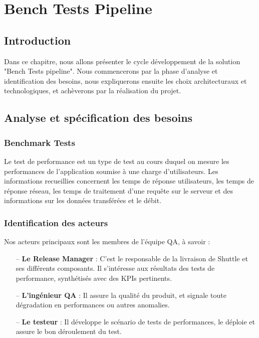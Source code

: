 
\setcounter{chapter}{2}
\chapter{Bench Tests Pipeline}
\minitoc %
\graphicspath{{Chapitre3/figures/}}

\pagestyle{fancy}
\fancyhf{}
\fancyhead[R]{\bfseries\rightmark}
\fancyfoot[R]{\thepage}
\renewcommand{\headrulewidth}{0.5pt}
\renewcommand{\footrulewidth}{0pt}
\renewcommand{\chaptermark}[1]{\markboth{\MakeUppercase{\chaptername~\thechapter. #1 }}{}}
\renewcommand{\sectionmark}[1]{\markright{\thechapter.\thesection~ #1}}

\begin{spacing}{1.2}

\section*{Introduction}
Dans ce chapitre, nous allons présenter le cycle développement de la solution "Bench Tests pipeline". Nous commencerons par la phase d’analyse et identification des besoins, nous expliquerons ensuite les choix architecturaux et technologiques, et achèverons par la réalisation du projet.  
\section{Analyse et spécification des besoins}
\subsection{Benchmark Tests}
Le test de performance est un type de test au cours duquel on mesure les performances de l'application soumise à une charge d'utilisateurs. Les informations recueillies concernent les temps de réponse utilisateurs, les temps de réponse réseau, les temps de traitement d’une requête sur le serveur et des informations sur les données transférées et le débit.
\subsection{Identification des acteurs}
Nos acteurs principaux sont les membres de l'équipe QA, à savoir : 
\begin{itemize}
    \setlength\itemsep{0em}
    \item[--] \textbf{Le Release Manager} : C'est le responsable de la livraison de Shuttle et ses différents composants. Il s'intéresse aux résultats des tests de performance, synthétisés avec des KPIs pertinents.
    \item[--] \textbf{L'ingénieur QA} : Il assure la qualité du produit, et signale toute dégradation en performances ou autres anomalies.
    \item[--] \textbf{Le testeur} : Il développe le scénario de tests de performances, le déploie et assure le bon déroulement du test. 
\end{itemize}

\end{spacing}
